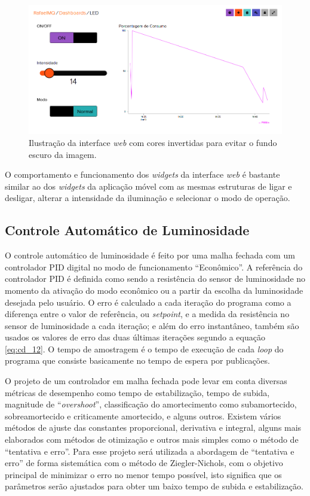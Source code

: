 \begin{figure}[ht]
    \begin{center}
    \includegraphics[width=\textwidth]{figuras/adaio.PNG}
    \end{center}
    \caption[Ilustração da interface \textit{web}.]{Ilustração da interface \textit{web} com cores invertidas para evitar o fundo escuro da imagem.}
    \label{adaio}
\end{figure}

O comportamento e funcionamento dos \textit{widgets} da interface \textit{web} é bastante similar ao dos \textit{widgets} da aplicação móvel com as mesmas estruturas de ligar e desligar, alterar a intensidade da iluminação e selecionar o modo de operação.

\subsection{Controle Automático de Luminosidade}

O controle automático de luminosidade é feito por uma malha fechada com um controlador PID digital no modo de funcionamento ``Econômico''. A referência do controlador \acf{PID} é definida como sendo a resistência do sensor de luminosidade no momento da ativação do modo econômico ou a partir da escolha da luminosidade desejada pelo usuário. O erro é calculado a cada iteração do programa como a diferença entre o valor de referência, ou \textit{setpoint}, e a  medida da resistência no sensor de luminosidade a cada iteração; e além do erro instantâneo, também são usados os valores de erro das duas últimas iterações segundo a equação \ref{eq:cd_12}. O tempo de amostragem é o tempo de execução de cada \textit{loop} do programa que consiste basicamente no tempo de espera por publicações.

O projeto de um controlador em malha fechada pode levar em conta diversas métricas de desempenho como tempo de estabilização, tempo de subida, magnitude de ``\textit{overshoot}'', classificação do amortecimento como subamortecido, sobreamortecido e criticamente amortecido, e alguns outros. Existem vários métodos de ajuste das constantes proporcional, derivativa e integral, alguns mais elaborados com métodos de otimização e outros mais simples como o método de ``tentativa e erro''. Para esse projeto será utilizada a abordagem de ``tentativa e erro'' de forma sistemática com o método de Ziegler-Nichols, com o objetivo principal de minimizar o erro no menor tempo possível, isto significa que os parâmetros serão ajustados para obter um baixo tempo de subida e estabilização.

